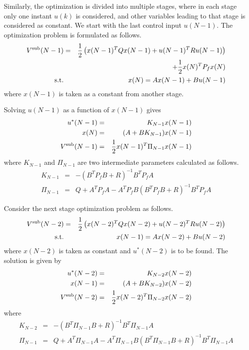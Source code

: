 Similarly, the optimization is divided into multiple stages, where in each stage only one instant $u(k)$ is considered, and other variables leading to that stage is considered as constant. We start with the last control input $u(N-1)$. The optimization problem is formulated as follows.
\begin{eqnarray}
  V^{\textup{sub}}(N-1) &=& \dfrac{1}{2}\left(x(N-1)^TQx(N-1) + u(N-1)^TRu(N-1)\right) \nonumber \\ && + \dfrac{1}{2}x(N)^TP_fx(N) \nonumber \\
  \textup{s.t.} && x(N) = Ax(N-1) + Bu(N-1) \nonumber
\end{eqnarray}
where $x(N-1)$ is taken as a constant from another stage.

Solving $u(N-1)$ as a function of $x(N-1)$ gives
\begin{eqnarray}
  u^*(N-1) &=& K_{N-1}x(N-1) \nonumber \\
  x(N) &=& (A+BK_{N-1})x(N-1) \nonumber \\
  V^{\textup{sub}}(N-1) &=& \dfrac{1}{2}x(N-1)^T\Pi_{N-1}x(N-1) \nonumber
\end{eqnarray}
where $K_{N-1}$ and $\Pi_{N-1}$ are two intermediate parameters calculated as follows.
\begin{eqnarray}
K_{N-1} &=& -(B^TP_fB + R)^{-1}B^TP_fA \nonumber \\
\Pi_{N-1} &=& Q + A^TP_fA-A^TP_fB(B^TP_fB+R)^{-1}B^TP_fA \nonumber
\end{eqnarray}

Consider the next stage optimization problem as follows.
\begin{eqnarray}
  V^{\textup{sub}}(N-2) &=& \dfrac{1}{2}\left(x(N-2)^TQx(N-2) + u(N-2)^TRu(N-2)\right) \nonumber \\
  \textup{s.t.} && x(N-1) = Ax(N-2) + Bu(N-2) \nonumber
\end{eqnarray}
where $x(N-2)$ is taken as constant and $u^*(N-2)$ is to be found. The solution is given by
\begin{eqnarray}
  u^*(N-2) &=& K_{N-2}x(N-2) \nonumber \\
  x(N-1) &=& (A+BK_{N-2})x(N-2) \nonumber \\
  V^{\textup{sub}}(N-2) &=& \dfrac{1}{2}x(N-2)^T\Pi_{N-2}x(N-2) \nonumber
\end{eqnarray}
where
\begin{eqnarray}
K_{N-2} &=& -(B^T\Pi_{N-1}B + R)^{-1}B^T\Pi_{N-1}A \nonumber \\
\Pi_{N-1} &=& Q + A^T\Pi_{N-1}A-A^T\Pi_{N-1}B(B^T\Pi_{N-1}B+R)^{-1}B^T\Pi_{N-1}A \nonumber
\end{eqnarray}

